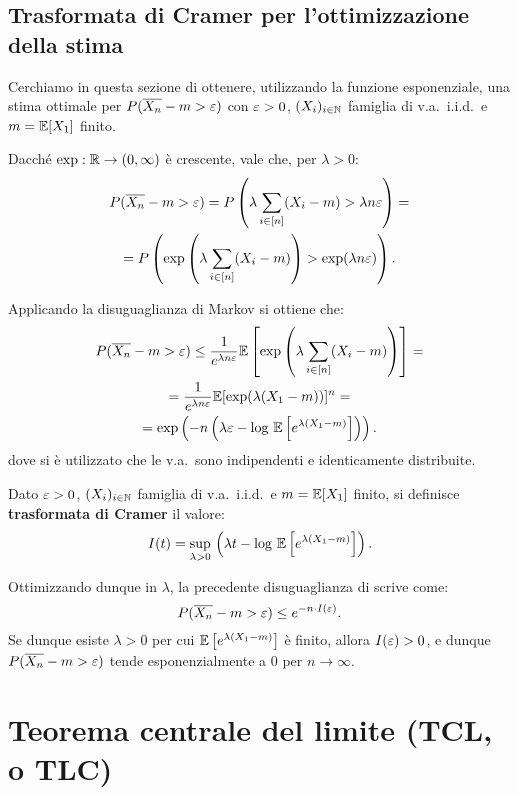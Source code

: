 \begin{multicols*}{2}
\subsection{Trasformata di Cramer per l'ottimizzazione della stima}

Cerchiamo in questa sezione di ottenere, utilizzando la funzione
esponenziale, una stima ottimale per
$P(\overline{X_n} - m > \varepsilon)$ con $\varepsilon > 0$, $(X_i)_{i \in \mathbb{N}}$ famiglia
di v.a.~i.i.d.~e $m = \mathbb{E}[X_1]$ finito. \smallskip

Dacché $\exp : \mathbb{R} \to (0, \infty)$ è crescente, vale che, per $\lambda > 0$:
\begin{multline*}
    P(\overline{X_n} - m > \varepsilon) = P\left(\lambda \sum_{i \in [n]} (X_i - m) > \lambda n \varepsilon\right) = \\ = P\left(\exp\left(\lambda \sum_{i \in [n]} (X_i - m)\right) > \exp(\lambda n \varepsilon)\right).
\end{multline*}

Applicando la disuguaglianza di Markov si ottiene che:
\begin{multline*}
    P(\overline{X_n} - m > \varepsilon) \leq \frac{1}{e^{\lambda n \varepsilon}} \mathbb{E}\left[\exp\left(\lambda \sum_{i \in [n]} (X_i - m)\right)\right] = \\
    = \frac{1}{e^{\lambda n \varepsilon}} \mathbb{E}[\exp(\lambda(X_1 - m))]^n = \\
    = \exp\left(-n\left(\lambda \varepsilon - \log \, \mathbb{E}\left[e^{\lambda(X_1-m)}\right]\right)\right).
\end{multline*}
dove si è utilizzato che le v.a.~sono indipendenti e identicamente distribuite.

\begin{definition}
    Dato $\varepsilon > 0$, $(X_i)_{i \in \mathbb{N}}$ famiglia
di v.a.~i.i.d.~e $m = \mathbb{E}[X_1]$ finito, si definisce \textbf{trasformata di Cramer}
    il valore:
    \[
        I(t) = \sup_{\lambda > 0} \, \left(\lambda t - \log \, \mathbb{E}\left[e^{\lambda(X_1-m)}\right]\right).
    \]
\end{definition}

Ottimizzando dunque in $\lambda$, la precedente disuguaglianza di scrive come:
\[
    P(\overline{X_n} - m > \varepsilon) \leq e^{-n \cdot I(\varepsilon)}.
\]
Se dunque esiste $\lambda > 0$ per cui $\mathbb{E}\left[e^{\lambda(X_1-m)}\right]$ è finito, allora $I(\varepsilon) > 0$, e dunque $P(\overline{X_n} - m > \varepsilon)$ tende esponenzialmente a $0$
per $n \to \infty$.

\section{Teorema centrale del limite (TCL, o TLC)}


\end{multicols*}
